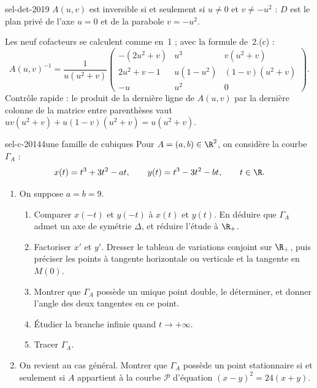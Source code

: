 \begin{corrige}{sel-det-2019}
 $A(u,v)$ est inversible si et seulement si $u\neq0$ et $v\neq-u^2$ : $D$ est le plan privé de l'axe $u=0$ et de la parabole $v=-u^2$.

 Les neuf cofacteurs se calculent comme en~1 ; avec la formule de~2.(c) :
\[A(u,v)^{-1}=\frac1{u(u^2+v)}\begin{pmatrix}-(2u^2+v)&u^3&v(u^2+v)\\2u^2+v-1&u(1-u^2)&(1-v)(u^2+v)\\-u&u^2&0\end{pmatrix}.\]
Contrôle rapide : le produit de la dernière ligne de $A(u,v)$ par la dernière colonne de la matrice entre parenthèses vaut $uv(u^2+v)+u(1-v)(u^2+v)=u(u^2+v)$.
\end{corrige}

\begin{exo}{sel-c-2014}{4}{une famille de cubiques}
Pour $A=(a,b)\in\R^2$, on considère la courbe $\Gamma_A$ :
\[x(t)=t^3+3t^2-at,\qquad y(t)=t^3-3t^2-bt,\qquad t\in\R.\]
\begin{enumerate}
\item On suppose $a=b=9$.
\begin{enumerate}
\item Comparer $x(-t)$ et $y(-t)$ à $x(t)$ et $y(t)$. En déduire que $\Gamma_A$ admet un axe de symétrie $\Delta$, et réduire l'étude à $\R_+$.
\item Factoriser $x'$ et $y'$. Dresser le tableau de variations conjoint sur $\R_+$, puis préciser les points à tangente horizontale ou verticale et la tangente en $M(0)$.
\item Montrer que $\Gamma_A$ possède un unique point double, le déterminer, et donner l'angle des deux tangentes en ce point.
\item Étudier la branche infinie quand $t\to+\infty$.
\item Tracer $\Gamma_A$.
\end{enumerate}
\item On revient au cas général. Montrer que $\Gamma_A$ possède un point stationnaire si et seulement si $A$ appartient à la courbe $\mathcal P$ d'équation $(x-y)^2=24(x+y)$.
\end{enumerate}
\end{exo}

